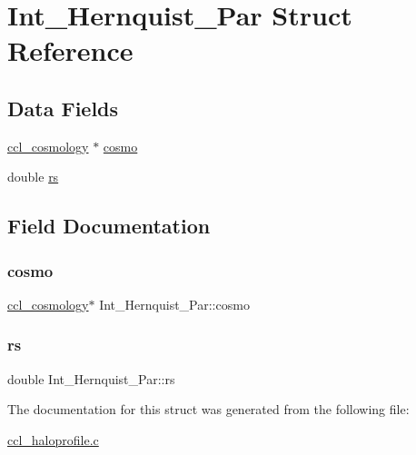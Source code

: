 \hypertarget{struct_int___hernquist___par}{}\section{Int\+\_\+\+Hernquist\+\_\+\+Par Struct Reference}
\label{struct_int___hernquist___par}
\subsection*{Data Fields}
\begin{DoxyCompactItemize}
\item 
\mbox{\hyperlink{structccl__cosmology}{ccl\+\_\+cosmology}} $\ast$ \mbox{\hyperlink{struct_int___hernquist___par_a2a8868430b8f97f90bab100b066639fc}{cosmo}}
\item 
double \mbox{\hyperlink{struct_int___hernquist___par_a3209045aae0e650941b75f1a853528f6}{rs}}
\end{DoxyCompactItemize}


\subsection{Field Documentation}
\mbox{\label{struct_int___hernquist___par_a2a8868430b8f97f90bab100b066639fc}} 
\subsubsection{\texorpdfstring{cosmo}{cosmo}}
{\footnotesize\ttfamily \mbox{\hyperlink{structccl__cosmology}{ccl\+\_\+cosmology}}$\ast$ Int\+\_\+\+Hernquist\+\_\+\+Par\+::cosmo}

\mbox{\label{struct_int___hernquist___par_a3209045aae0e650941b75f1a853528f6}} 
\subsubsection{\texorpdfstring{rs}{rs}}
{\footnotesize\ttfamily double Int\+\_\+\+Hernquist\+\_\+\+Par\+::rs}



The documentation for this struct was generated from the following file\+:\begin{DoxyCompactItemize}
\item 
\mbox{\hyperlink{ccl__haloprofile_8c}{ccl\+\_\+haloprofile.\+c}}\end{DoxyCompactItemize}
